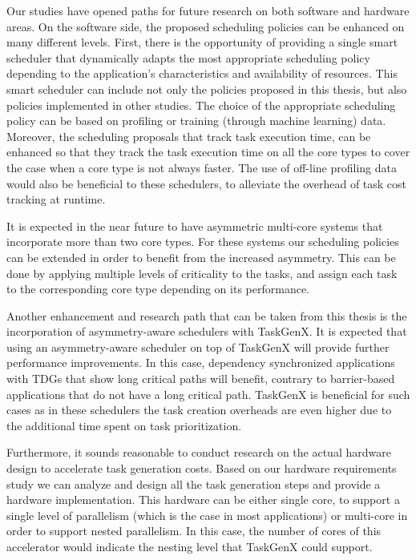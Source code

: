 Our studies have opened paths for future research on both software and hardware areas.
On the software side, the proposed scheduling policies can be enhanced on many different levels.
First, there is the opportunity of providing a single smart scheduler that dynamically adapts the most appropriate scheduling policy depending to the application's characteristics and availability of resources.
This smart scheduler can include not only the policies proposed in this thesis, but also policies implemented in other studies.
The choice of the appropriate scheduling policy can be based on profiling or training (through machine learning) data.
Moreover, the scheduling proposals that track task execution time, can be enhanced so that they track the task execution time on all the core types to cover the case when a core type is not always faster.
The use of off-line profiling data would also be beneficial to these schedulers, to alleviate the overhead of task cost tracking at runtime.

It is expected in the near future to have asymmetric multi-core systems that incorporate more than two core types.
For these systems our scheduling policies can be extended in order to benefit from the increased asymmetry.
This can be done by applying multiple levels of criticality to the tasks, and assign each task to the corresponding core type depending on its performance.

Another enhancement and research path that can be taken from this thesis is the incorporation of asymmetry-aware schedulers with TaskGenX. 
It is expected that using an asymmetry-aware scheduler on top of TaskGenX will provide further performance improvements.
In this case, dependency synchronized applications with TDGs that show long critical paths will benefit, contrary to barrier-based applications that do not have a long critical path.
TaskGenX is beneficial for such cases as in these schedulers the task creation overheads are even higher due to the additional time spent on task prioritization.

Furthermore, it sounds reasonable to conduct research on the actual hardware design to accelerate task generation costs.
Based on our hardware requirements study we can analyze and design all the task generation steps and provide a hardware implementation.
This hardware can be either single core, to support a single level of parallelism (which is the case in most applications) or multi-core in order to support nested parallelism.
In this case, the number of cores of this accelerator would indicate the nesting level that TaskGenX could support.







